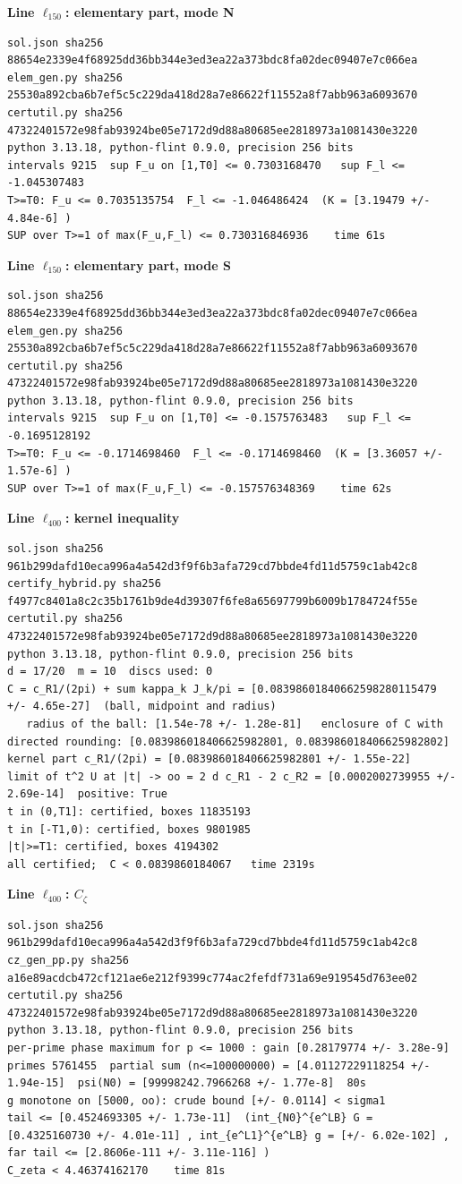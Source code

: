 \documentclass[11pt,reqno]{amsart}
\numberwithin{equation}{section}
\theoremstyle{definition}
\theoremstyle{remark}
\newcommand{\appsub}[1]{\par\medskip\noindent\textbf{#1}\par\nobreak\smallskip}
\begin{document}
\appsub{Line $\ell_{150}$: elementary part, mode N}
\begin{lstlisting}
sol.json sha256 88654e2339e4f68925dd36bb344e3ed3ea22a373bdc8fa02dec09407e7c066ea
elem_gen.py sha256 25530a892cba6b7ef5c5c229da418d28a7e86622f11552a8f7abb963a6093670
certutil.py sha256 47322401572e98fab93924be05e7172d9d88a80685ee2818973a1081430e3220
python 3.13.18, python-flint 0.9.0, precision 256 bits
intervals 9215  sup F_u on [1,T0] <= 0.7303168470   sup F_l <= -1.045307483
T>=T0: F_u <= 0.7035135754  F_l <= -1.046486424  (K = [3.19479 +/- 4.84e-6] )
SUP over T>=1 of max(F_u,F_l) <= 0.730316846936    time 61s
\end{lstlisting}
\appsub{Line $\ell_{150}$: elementary part, mode S}
\begin{lstlisting}
sol.json sha256 88654e2339e4f68925dd36bb344e3ed3ea22a373bdc8fa02dec09407e7c066ea
elem_gen.py sha256 25530a892cba6b7ef5c5c229da418d28a7e86622f11552a8f7abb963a6093670
certutil.py sha256 47322401572e98fab93924be05e7172d9d88a80685ee2818973a1081430e3220
python 3.13.18, python-flint 0.9.0, precision 256 bits
intervals 9215  sup F_u on [1,T0] <= -0.1575763483   sup F_l <= -0.1695128192
T>=T0: F_u <= -0.1714698460  F_l <= -0.1714698460  (K = [3.36057 +/- 1.57e-6] )
SUP over T>=1 of max(F_u,F_l) <= -0.157576348369    time 62s
\end{lstlisting}
\appsub{Line $\ell_{400}$: kernel inequality}
\begin{lstlisting}
sol.json sha256 961b299dafd10eca996a4a542d3f9f6b3afa729cd7bbde4fd11d5759c1ab42c8
certify_hybrid.py sha256 f4977c8401a8c2c35b1761b9de4d39307f6fe8a65697799b6009b1784724f55e
certutil.py sha256 47322401572e98fab93924be05e7172d9d88a80685ee2818973a1081430e3220
python 3.13.18, python-flint 0.9.0, precision 256 bits
d = 17/20  m = 10  discs used: 0 
C = c_R1/(2pi) + sum kappa_k J_k/pi = [0.08398601840662598280115479 +/- 4.65e-27]  (ball, midpoint and radius)
   radius of the ball: [1.54e-78 +/- 1.28e-81]   enclosure of C with directed rounding: [0.083986018406625982801, 0.083986018406625982802]
kernel part c_R1/(2pi) = [0.083986018406625982801 +/- 1.55e-22]
limit of t^2 U at |t| -> oo = 2 d c_R1 - 2 c_R2 = [0.0002002739955 +/- 2.69e-14]  positive: True
t in (0,T1]: certified, boxes 11835193
t in [-T1,0): certified, boxes 9801985
|t|>=T1: certified, boxes 4194302
all certified;  C < 0.0839860184067   time 2319s
\end{lstlisting}
\appsub{Line $\ell_{400}$: $C_\zeta$}
\begin{lstlisting}
sol.json sha256 961b299dafd10eca996a4a542d3f9f6b3afa729cd7bbde4fd11d5759c1ab42c8
cz_gen_pp.py sha256 a16e89acdcb472cf121ae6e212f9399c774ac2fefdf731a69e919545d763ee02
certutil.py sha256 47322401572e98fab93924be05e7172d9d88a80685ee2818973a1081430e3220
python 3.13.18, python-flint 0.9.0, precision 256 bits
per-prime phase maximum for p <= 1000 : gain [0.28179774 +/- 3.28e-9]
primes 5761455  partial sum (n<=100000000) = [4.01127229118254 +/- 1.94e-15]  psi(N0) = [99998242.7966268 +/- 1.77e-8]  80s
g monotone on [5000, oo): crude bound [+/- 0.0114] < sigma1
tail <= [0.4524693305 +/- 1.73e-11]  (int_{N0}^{e^LB} G = [0.4325160730 +/- 4.01e-11] , int_{e^L1}^{e^LB} g = [+/- 6.02e-102] , far tail <= [2.8606e-111 +/- 3.11e-116] )
C_zeta < 4.46374162170    time 81s
\end{lstlisting}
\end{document}
